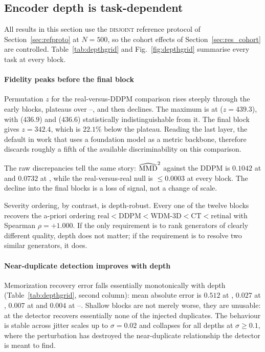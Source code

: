 \subsection{Encoder depth is task-dependent}
\label{sec:res_depth}

All results in this section use the \textsc{disjoint} reference protocol of
Section~\ref{sec:refproto} at $N = 500$, so the cohort effects of
Section~\ref{sec:res_cohort} are controlled. Table~\ref{tab:depthgrid} and
Fig.~\ref{fig:depthgrid} summarise every task at every block.

\paragraph{Fidelity peaks before the final block}
Permutation $z$ for the real-versus-DDPM comparison rises steeply through the
early blocks, plateaus over --, and then declines. The maximum is at
 ($z = 439.3$), with  ($436.9$) and  ($436.6$) statistically
indistinguishable from it. The final block gives $z = 342.4$, which is $22.1\%$
below the plateau. Reading the last layer, the default in work that uses a
foundation model as a metric backbone, therefore discards roughly a fifth of the
available discriminability on this comparison.

The raw discrepancies tell the same story: $\widehat{\mathrm{MMD}}^2$ against the DDPM
is $0.1042$ at  and $0.0732$ at , while the real-versus-real null
is $\le 0.0003$ at every block. The decline into the final blocks is a loss of
signal, not a change of scale.

Severity ordering, by contrast, is depth-robust. Every one of the twelve blocks
recovers the a-priori ordering
$\text{real} < \text{DDPM} < \text{WDM-3D} < \text{CT} < \text{retinal}$ with
Spearman $\rho = +1.000$. If the only requirement is to rank generators of
clearly different quality, depth does not matter; if the requirement is to
resolve two similar generators, it does.

\paragraph{Near-duplicate detection improves with depth}
Memorization recovery error falls essentially monotonically with depth
(Table~\ref{tab:depthgrid}, second column): mean absolute error is $0.512$ at
, $0.027$ at , $0.007$ at  and $0.004$ at --.
Shallow blocks are not merely worse, they are unusable: at  the detector
recovers essentially none of the injected duplicates. The behaviour is stable
across jitter scales up to $\sigma = 0.02$ and collapses for all depths at
$\sigma \ge 0.1$, where the perturbation has destroyed the near-duplicate
relationship the detector is meant to find.


